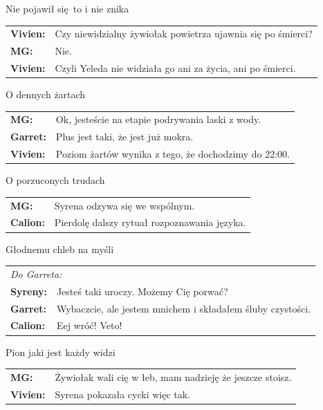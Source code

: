\documentclass[10pt,twoside,twocolumn]{book}
\begin{document}
\begin{rpg-quotebox}{Nie pojawił się\, to i nie znika}
   \begin{tabularx}{\columnwidth}{lX}
      \textbf{Vivien:} & Czy niewidzialny żywiołak powietrza ujawnia się po śmierci?\\
      \textbf{MG:} & Nie.\\
      \textbf{Vivien:} & Czyli Yeleda nie widziała go ani za życia, ani po śmierci.\\
   \end{tabularx}
\end{rpg-quotebox}

\begin{rpg-quotebox}{O dennych żartach}
   \begin{tabularx}{\columnwidth}{lX}
      \textbf{MG:} & Ok, jesteście na etapie podrywania laski z wody.\\
      \textbf{Garret:} & Plus jest taki, że jest już mokra.\\
      \textbf{Vivien:} & Poziom żartów wynika z tego, że dochodzimy do 22:00.\\
   \end{tabularx}
\end{rpg-quotebox}

\begin{rpg-quotebox}{O porzuconych trudach}
   \begin{tabularx}{\columnwidth}{lX}
      \textbf{MG:} & Syrena odzywa się we wspólnym.\\
      \textbf{Calion:} & Pierdolę dalszy rytuał rozpoznawania języka.\\
   \end{tabularx}
\end{rpg-quotebox}

\begin{rpg-quotebox}{Głodnemu chleb na myśli}
   \begin{tabularx}{\columnwidth}{lX}
      \multicolumn{2}{l}{\textit{Do Garreta:}}\\
      \textbf{Syreny:} & Jesteś taki uroczy. Możemy Cię porwać?\\
      \textbf{Garret:} & Wybaczcie, ale jestem mnichem i składałem śluby czystości.\\
      \textbf{Calion:} & Eej wróć! Veto!\\
   \end{tabularx}
\end{rpg-quotebox}

\begin{rpg-quotebox}{Pion jaki jest każdy widzi}
   \begin{tabularx}{\columnwidth}{lX}
      \textbf{MG:} & Żywiołak wali cię w łeb, mam nadzieję że jeszcze stoisz.\\
      \textbf{Vivien:} & Syrena pokazała cycki więc tak.\\
   \end{tabularx}
\end{rpg-quotebox}
\end{document}
